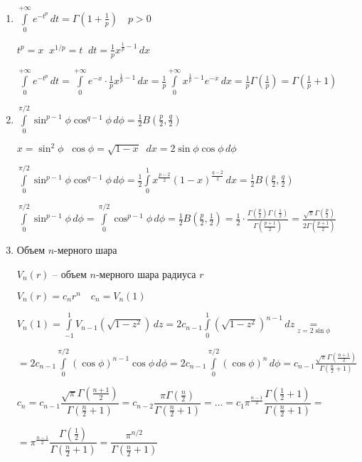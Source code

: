 
\begin{example}\thmslashn
	
	\begin{enumerate}
		\item 
		$\int\limits_{0}^{+\infty} e^{-t^p} \,dt = \Gamma \left(1 + \frac{1}{p} \right)\quad p > 0$
		
		$t^p = x\;\; x^{1/p} = t \;\; dt = \frac{1}{p}x^{\frac{1}{p}-1}\,dx$
		
		$\int\limits_{0}^{+\infty} e^{-t^p} \,dt =\int\limits_{0}^{+\infty} e^{-x}\cdot \frac{1}{p}x^{\frac{1}{p}-1}\,dx = \frac{1}{p} \int\limits_{0}^{+\infty} x^{\frac{1}{p}-1} e^{-x} \,dx = \frac{1}{p} \Gamma\left(\frac{1}{p}\right) = \Gamma\left(\frac{1}{p}+1\right)$
		
		\item
		$\int\limits_{0}^{\pi/2} \sin^{p-1} \phi \cos^{q-1}\phi \,d\phi = \frac{1}{2} B\left(\frac{p}{2}, \frac{q}{2}\right)$
		
		$x = \sin^2 \phi \;\; \cos \phi = \sqrt{1-x} \;\; dx = 2\sin \phi \cos\phi \,d\phi$
		
		$\int\limits_{0}^{\pi/2} \sin^{p-1} \phi \cos^{q-1}\phi \,d\phi =  \frac{1}{2} \int\limits_{0}^{1} x^{\frac{p-2}{2}} (1-x)^{\frac{q-2}{2}}\,dx = \frac{1}{2} B\left(\frac{p}{2}, \frac{q}{2}\right)$
		
		$\int\limits_{0}^{\pi/2} \sin^{p-1} \phi \,d\phi = \int\limits_{0}^{\pi/2} \cos^{p-1} \phi \,d\phi = \frac{1}{2} B\left(\frac{p}{2}, \frac{1}{2}\right) = \frac{1}{2} \cdot \frac{ \Gamma\left(\frac{p}{2}\right) \Gamma\left(\frac{1}{2}\right)} { \Gamma\left(\frac{p+1}{2}\right)} = \frac{\sqrt{\pi} \Gamma\left(\frac{p}{2}\right)} {2 \Gamma\left(\frac{p+1}{2}\right)}$
		
		\item
		Объем $n$-мерного шара
		
		$V_n(r)$ -- объем $n$-мерного шара радиуса $r$
		
		$V_n(r) = c_n r^n\quad c_n = V_n(1)$
		
		$V_n(1) = \int\limits_{-1}^{1} V_{n-1}(\sqrt{1 - z^2}) \,dz = 2c_{n-1}\int\limits_{0}^{1} (\sqrt{1-z^2})^{n-1}\,dz \underset{z = 2\sin \phi }=$
		
		$= 2c_{n-1} \int\limits_{0}^{\pi/2} (\cos \phi)^{n-1} \cos \phi\,d\phi = 2c_{n-1} \int\limits_{0}^{\pi/2} (\cos \phi)^{n}\,d\phi = c_{n-1}\frac{\sqrt{\pi} \Gamma\left( \frac{n+1}{2} \right)}{ \Gamma\left(\frac{n}{2}+1 \right)}$
		
		$c_n = c_{n-1}\dfrac{\sqrt{\pi} \Gamma\left( \frac{n+1}{2} \right)}{ \Gamma\left(\frac{n}{2}+1 \right)} = c_{n-2} \dfrac{\pi \Gamma\left( \frac{n}{2} \right)}{ \Gamma\left(\frac{n}{2}+1 \right)} = \ldots =c_1 \pi^{\frac{n-1}{2}} \dfrac{\Gamma \left( \frac{1}{2} + 1\right)}{\Gamma \left( \frac{n}{2} + 1\right)} =$
		
		$= \pi^{\frac{n-1}{2}} \dfrac{\Gamma \left( \frac{1}{2} \right)}{\Gamma \left( \frac{n}{2} + 1\right)} = \dfrac{\pi^{n/2}}{\Gamma \left( \frac{n}{2} + 1\right)}$
		
	\end{enumerate}

\end{example}